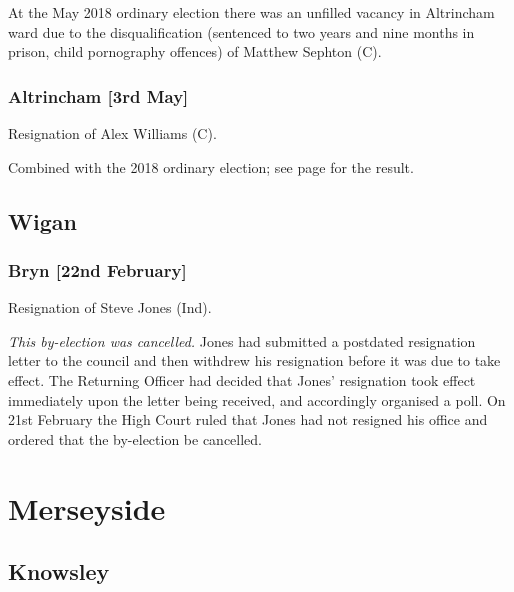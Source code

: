 \documentclass[a4paper,openany]{book}
\begin{document}
\begin{resultsiii}
At the May 2018 ordinary election there was an unfilled vacancy in Altrincham ward due to the disqualification (sentenced to two years and nine months in prison, child pornography offences) of Matthew Sephton (C).

\subsubsection*{Altrincham \hspace*{\fill}\nolinebreak[1]%
\enspace\hspace*{\fill}
[3rd May]}


Resignation of Alex Williams (C).

Combined with the 2018 ordinary election; see page \pageref{AltrinchamTrafford} for the result.

\subsection*{Wigan}

\subsubsection*{Bryn \hspace*{\fill}\nolinebreak[1]%
\enspace\hspace*{\fill}
[22nd February]}


Resignation of Steve Jones (Ind).

\emph{This by-election was cancelled.}  Jones had submitted a postdated resignation letter to the council and then withdrew his resignation before it was due to take effect.  The Returning Officer had decided that Jones' resignation took effect immediately upon the letter being received, and accordingly organised a poll.  On 21st February the High Court ruled that Jones had not resigned his office and ordered that the by-election be cancelled.

\section{Merseyside}

\subsection*{Knowsley}


\end{resultsiii}
\end{document}
